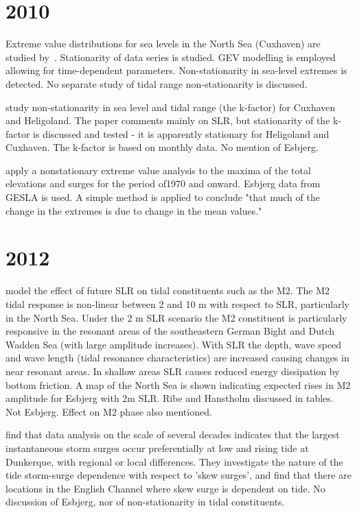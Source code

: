 \documentclass[12pt,a4]{article}
\begin{document}
\section{2010}
Extreme value distributions for sea levels in the North Sea (Cuxhaven) are studied by~\cite{Mudersbach2010}. Stationarity of data series is studied. GEV modelling is employed allowing for time-dependent parameters. Non-stationarity in sea-level extremes is detected. No separate study of tidal range non-stationarity is discussed.

\cite{Wahl2010a} study non-stationarity in sea level and tidal range (the k-factor) for Cuxhaven and Heligoland. The paper comments mainly on SLR, but stationarity of the k-factor is discussed and tested - it is apparently stationary for Heligoland and Cuxhaven. The k-factor is based on monthly data. No mention of Esbjerg.

\cite{Menendez2010} apply a nonstationary extreme value analysis  to the maxima of the total elevations and surges for the period of1970 and onward. Esbjerg data from GESLA is used. A simple method is applied to conclude "that much of the change in the extremes is due to change in the mean values."


\section{2012}
\cite{Pickering2012} model the effect of future SLR on tidal constituents such as the M2. The M2 tidal response is non-linear between 2 and 10 m with respect to SLR, particularly in the North Sea.
Under the 2 m SLR scenario the M2 constituent is particularly responsive in the resonant areas of  the southeastern German Bight and Dutch Wadden Sea (with large amplitude increases). With SLR the depth, wave speed and wave length (tidal resonance characteristics) are increased causing changes in near resonant areas. In   shallow areas SLR causes reduced energy dissipation by bottom friction. A map of the North Sea is shown indicating expected rises in M2 amplitude for Esbjerg with 2m SLR. Ribe and Hanstholm discussed in tables. Not Esbjerg. Effect on M2 phase also mentioned.

\cite{Idier2012} find that data analysis on the scale of several decades indicates that the largest instantaneous storm surges occur preferentially at low and rising tide at Dunkerque, with regional or local differences. They investigate the nature of the tide storm-surge dependence with respect to 'skew surges', and find that there are locations in the English Channel where skew surge is dependent on tide. No discussion of Esbjerg, nor of non-stationarity in tidal constituents.
\end{document}
